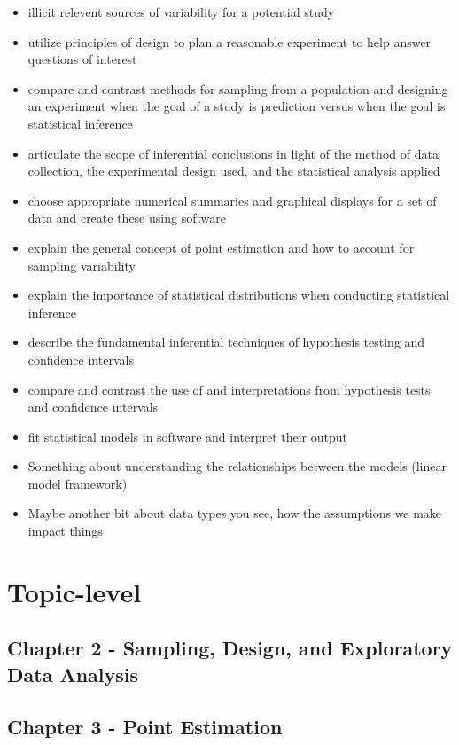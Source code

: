 \documentclass[]{book}
\begin{document}
\begin{itemize}
\item
  illicit relevent sources of variability for a potential study
\item
  utilize principles of design to plan a reasonable experiment to help
  answer questions of interest
\item
  compare and contrast methods for sampling from a population and
  designing an experiment when the goal of a study is prediction versus
  when the goal is statistical inference
\item
  articulate the scope of inferential conclusions in light of the method
  of data collection, the experimental design used, and the statistical
  analysis applied
\item
  choose appropriate numerical summaries and graphical displays for a
  set of data and create these using software
\item
  explain the general concept of point estimation and how to account for
  sampling variability
\item
  explain the importance of statistical distributions when conducting
  statistical inference
\item
  describe the fundamental inferential techniques of hypothesis testing
  and confidence intervals
\item
  compare and contrast the use of and interpretations from hypothesis
  tests and confidence intervals
\item
  fit statistical models in software and interpret their output
\item
  Something about understanding the relationships between the models
  (linear model framework)
\item
  Maybe another bit about data types you see, how the assumptions we
  make impact things
\end{itemize}

\section{Topic-level}\label{topic-level}

\subsection{Chapter 2 - Sampling, Design, and Exploratory Data
Analysis}\label{chapter-2---sampling-design-and-exploratory-data-analysis}

\subsection{Chapter 3 - Point
Estimation}\label{chapter-3---point-estimation}
\end{document}
